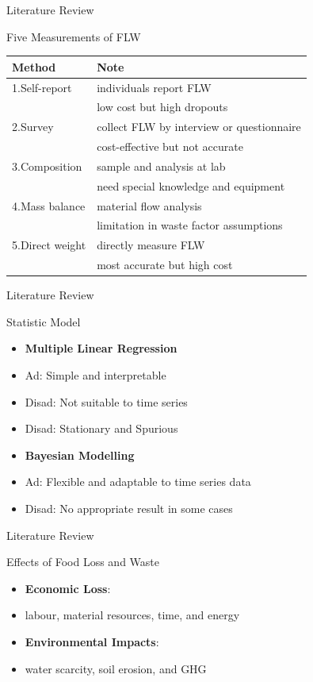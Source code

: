 \documentclass[
  ignorenonframetext,
]{beamer}
\providecommand{\tightlist}{%
  \setlength{\itemsep}{0pt}\setlength{\parskip}{0pt}}
\begin{document}
\begin{frame}{Literature Review}
\protect\hypertarget{literature-review-3}{}
\begin{block}{Five Measurements of FLW}
\protect\hypertarget{five-measurements-of-flw}{}
\begin{longtable}[]{@{}ll@{}}
\toprule()
Method & Note \\
\midrule()
\endhead
1.Self-report & individuals report FLW \\
& low cost but high dropouts \\
2.Survey & collect FLW by interview or questionnaire \\
& cost-effective but not accurate \\
3.Composition & sample and analysis at lab \\
& need special knowledge and equipment \\
4.Mass balance & material flow analysis \\
& limitation in waste factor assumptions \\
5.Direct weight & directly measure FLW \\
& most accurate but high cost \\
\bottomrule()
\end{longtable}
\end{block}
\end{frame}

\begin{frame}{Literature Review}
\protect\hypertarget{literature-review-4}{}
\begin{block}{Statistic Model}
\protect\hypertarget{statistic-model}{}
\begin{itemize}
\item
  \textbf{Multiple Linear Regression}
\item
  Ad: Simple and interpretable
\item
  Disad: Not suitable to time series
\item
  Disad: Stationary and Spurious
\item
  \textbf{Bayesian Modelling}
\item
  Ad: Flexible and adaptable to time series data
\item
  Disad: No appropriate result in some cases
\end{itemize}
\end{block}
\end{frame}

\begin{frame}{Literature Review}
\protect\hypertarget{literature-review-5}{}
\begin{block}{Effects of Food Loss and Waste}
\protect\hypertarget{effects-of-food-loss-and-waste}{}
\begin{itemize}
\tightlist
\item
  \textbf{Economic Loss}:
\item
  labour, material resources, time, and energy
\item
  \textbf{Environmental Impacts}:
\item
  water scarcity, soil erosion, and GHG
\end{itemize}
\end{block}
\end{frame}
\end{document}
